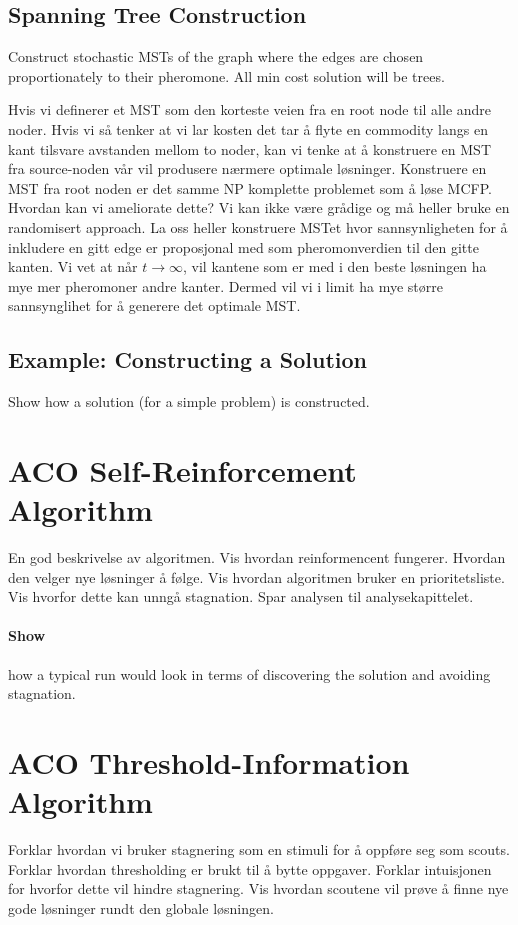\subsection{Spanning Tree Construction}
Construct stochastic MSTs of the graph where the edges are chosen proportionately to their pheromone. All min cost solution will be trees.

Hvis vi definerer et MST som den korteste veien fra en root node til alle andre noder. Hvis vi så tenker at vi lar kosten det tar å flyte en commodity langs en kant tilsvare avstanden mellom to noder, kan vi tenke at å konstruere en MST fra source-noden vår vil produsere nærmere optimale løsninger. Konstruere en MST fra root noden er det samme NP komplette problemet som å løse MCFP. Hvordan kan vi ameliorate dette? Vi kan ikke være grådige og må heller bruke en randomisert approach. La oss heller konstruere MSTet hvor sannsynligheten for å inkludere en gitt edge er proposjonal med som pheromonverdien til den gitte kanten. Vi vet at når $t \rightarrow \infty$, vil kantene som er med i den beste løsningen ha mye mer pheromoner andre kanter. Dermed vil vi i limit ha mye større sannsynglihet for å generere det optimale MST.

\subsection{Example: Constructing a Solution}
Show how a solution (for a simple problem) is constructed.

%


\section{ACO Self-Reinforcement Algorithm}
En god beskrivelse av algoritmen. Vis hvordan reinformencent fungerer. Hvordan den velger nye løsninger å følge. Vis hvordan algoritmen bruker en prioritetsliste. Vis hvorfor dette kan unngå stagnation. Spar analysen til analysekapittelet.
\paragraph{Show} how a typical run would look in terms of discovering the solution and avoiding stagnation.

%


\section{ACO Threshold-Information Algorithm}
Forklar hvordan vi bruker stagnering som en stimuli for å oppføre seg som scouts. Forklar hvordan thresholding er brukt til å bytte oppgaver. Forklar intuisjonen for hvorfor dette vil hindre stagnering. Vis hvordan scoutene vil prøve å finne nye gode løsninger rundt den globale løsningen. 

